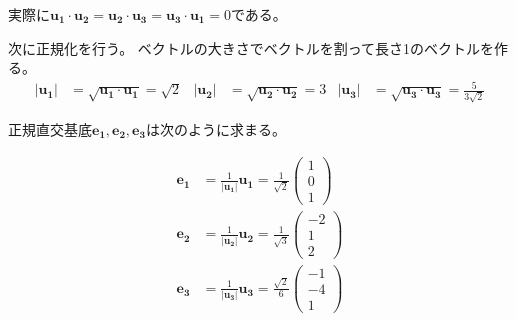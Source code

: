 \documentclass[12pt,b5paper]{ltjsarticle}
\begin{document}
実際に$
\bm{u_1}\cdot\bm{u_2} =
\bm{u_2}\cdot\bm{u_3} =
\bm{u_3}\cdot\bm{u_1} = 0
$である。


次に正規化を行う。
ベクトルの大きさでベクトルを割って長さ1のベクトルを作る。
\begin{align}
 \lvert\bm{u_1}\rvert &= \sqrt{\bm{u_1}\cdot\bm{u_1}}=\sqrt{2} &
 \lvert\bm{u_2}\rvert &= \sqrt{\bm{u_2}\cdot\bm{u_2}}=3 &
 \lvert\bm{u_3}\rvert &= \sqrt{\bm{u_3}\cdot\bm{u_3}}=\frac{5}{3\sqrt{2}}
\end{align}

正規直交基底$\bm{e_1},\bm{e_2},\bm{e_3}$は次のように求まる。

\begin{align}
 \bm{e_1} &= \frac{1}{\lvert\bm{u_1}\rvert}\bm{u_1}
 = \frac{1}{\sqrt{2}}\begin{pmatrix}1\\0\\1\end{pmatrix}\\
 \bm{e_2} &= \frac{1}{\lvert\bm{u_2}\rvert}\bm{u_2} 
 = \frac{1}{\sqrt{3}}\begin{pmatrix}-2\\1\\2\end{pmatrix}\\
 \bm{e_3} &= \frac{1}{\lvert\bm{u_3}\rvert}\bm{u_3}
 = \frac{\sqrt{2}}{6}\begin{pmatrix}-1\\-4\\1\end{pmatrix}
\end{align}
\end{document}
